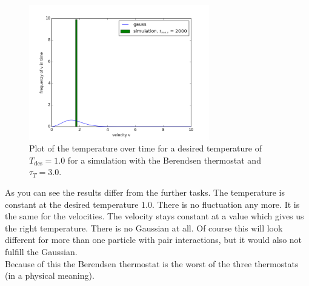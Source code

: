 \begin{figure}[ht]
	\centering
	\includegraphics[width=0.7\textwidth]{../dat/berendsen_T1d0_tau3d0_vv.png}
	\caption{
		Plot of the temperature over time for a desired temperature of $T_\text{des}=1.0$ for a simulation with the Berendsen thermostat and $\tau_T =3.0$.
	}
	\label{berendsenvv}
\end{figure}

As you can see the results differ from the further tasks.
The temperature is constant at the desired temperature 1.0. 
There is no fluctuation any more.
It is the same for the velocities. 
The velocity stays constant at a value which gives us the right temperature. 
There is no Gaussian at all.
Of course this will look different for more than one particle with pair interactions, but it would also not fulfill the Gaussian.\\

Because of this the Berendsen thermostat is the worst of the three thermostats (in a physical meaning).

\FloatBarrier